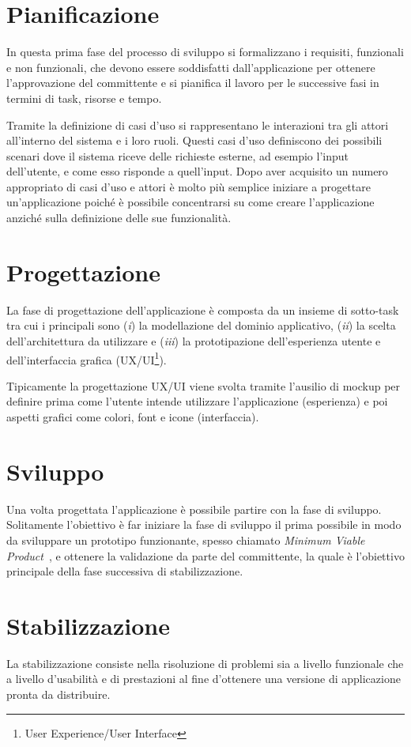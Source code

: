 \section{Pianificazione}
In questa prima fase del processo di sviluppo si formalizzano i requisiti, 
funzionali e non funzionali, 
che devono essere soddisfatti dall'applicazione per ottenere l'approvazione del committente e si pianifica il lavoro per le successive fasi in termini di task, risorse e tempo.

Tramite la definizione di casi d'uso si rappresentano le interazioni tra gli attori all'interno del sistema e i loro ruoli. 
Questi casi d'uso definiscono dei possibili scenari dove il sistema riceve delle richieste esterne, 
ad esempio l'input dell'utente,
e come esso risponde a quell'input. 
Dopo aver acquisito un numero appropriato di casi d'uso e attori è molto più semplice iniziare a progettare un'applicazione poiché è possibile concentrarsi su come creare l'applicazione anziché sulla definizione delle sue funzionalità.

\section{Progettazione}
La fase di progettazione dell'applicazione è composta da un insieme di sotto-task tra cui i principali sono (\textit{i}) la modellazione del dominio applicativo,
(\textit{ii}) la scelta dell'architettura da utilizzare e (\textit{iii}) la prototipazione dell'esperienza utente e dell'interfaccia grafica (UX/UI\footnote{User Experience/User Interface}).

Tipicamente la progettazione UX/UI viene svolta tramite l'ausilio di mockup per definire prima come l'utente intende utilizzare l'applicazione (esperienza) e poi aspetti grafici come colori,
font e icone (interfaccia).

\section{Sviluppo}
Una volta progettata l'applicazione è possibile partire con la fase di sviluppo. 
Solitamente l'obiettivo è far iniziare la fase di sviluppo il prima possibile in modo da sviluppare un prototipo funzionante, 
spesso chiamato \textit{Minimum Viable Product}~\cite{ries2011startup}, 
e ottenere la validazione da parte del committente, 
la quale è l'obiettivo principale della fase successiva di stabilizzazione.

\section{Stabilizzazione}
La stabilizzazione consiste nella risoluzione di problemi sia a livello funzionale che a livello d'usabilità e di prestazioni al fine d'ottenere una versione di applicazione pronta da distribuire. 

